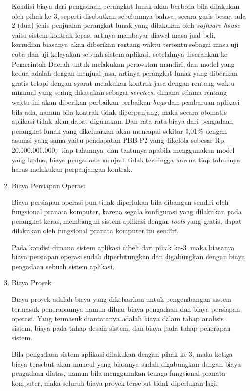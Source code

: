 \documentclass[pdftex, 12pt, oneside]{article}
\begin{document}
\begin{enumerate}[1.]
  Kondisi biaya dari pengadaan perangkat lunak akan berbeda bila dilakukan oleh pihak ke-3, seperti disebutkan sebelumnya bahwa, secara garis besar, ada 2 (dua) jenis penjualan perangkat lunak yang dilakukan oleh \textit{software house} yaitu sistem kontrak lepas, artinya membayar diawal masa jual beli, kemudian biasanya akan diberikan rentang waktu tertentu sebagai masa uji coba dan uji kelayakan sebuah sistem aplikasi, setelahnya diserahkan ke Pemerintah Daerah untuk melakukan perawatan mandiri, dan model yang kedua adalah dengan menjual jasa, artinya perangkat lunak yang diberikan gratis tetapi dengan syarat melakukan kontrak jasa dengan rentang waktu minimal yang sering dikatakan sebagai \textit{services}, dimana selama rentang waktu ini akan diberikan perbaikan-perbaikan \textit{bugs} dan pembaruan aplikasi bila ada, namun bila kontrak tidak diperpanjang, maka secara otomatis aplikasi tidak akan dapat digunakan. Dan rata-rata biaya dari pengadaan perangkat lunak yang dikeluarkan akan mencapai sekitar 0,01\% dengan asumsi yang sama yaitu pendapatan PBB-P2 yang dikelola sebesar Rp. 20.000.000.000,- tiap tahunnya, dan tentunya apabila menggunakan model yang kedua, biaya pengadaan menjadi tidak terhingga karena tiap tahunnya harus melakukan perpanjangan kontrak.
  
  \item Biaya Persiapan Operasi
  
  Biaya persiapan operasi pun tidak diperlukan bila dibangun sendiri oleh fungsional pranata komputer, karena segala konfigurasi yang dilakukan pada perangkat keras, membangun sistem aplikasi dengan \textit{tools} yang gratis, dapat dilakukan oleh fungsional pranata komputer itu sendiri.
  
  Pada kondisi dimana sistem aplikasi dibeli dari pihak ke-3, maka biasanya biaya persiapan operasi sudah diperhitungkan dan digabungkan dengan biaya pengadaan sebuah sistem aplikasi.
  
  \item Biaya Proyek 
  
  Biaya proyek adalah biaya yang dikeluarkan untuk pengembangan sistem termasuk penerapannya namun diluar biaya pengadaan dan biaya persiapan operasi. Yang termasuk diantaranya adalah biaya dalam tahap analisis sistem, biaya pada tahap desain sistem, dan biaya pada tahap penerapan sistem. 
  
  Bila pengadaan sistem aplikasi dilakukan dengan pihak ke-3, maka ketiga biaya tersebut akan muncul yang biasanya sudah digabungkan dengan biaya pengadaan diatas, namun bila menggunakan tenaga fungsional pranata komputer, maka seluruh biaya proyek tersebut tidak diperlukan lagi.
  

\end{enumerate}
\end{document}
